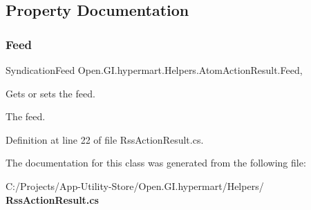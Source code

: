 \subsection{Property Documentation}
\mbox{\label{class_open_1_1_g_i_1_1hypermart_1_1_helpers_1_1_atom_action_result_a17a5a951bdf5ed9f8a93f24843e124ca}} 
\subsubsection{Feed}
{\footnotesize\ttfamily Syndication\+Feed Open.\+G\+I.\+hypermart.\+Helpers.\+Atom\+Action\+Result.\+Feed\hspace{0.3cm}{\ttfamily [get]}, {\ttfamily [set]}}



Gets or sets the feed. 

The feed. 

Definition at line 22 of file Rss\+Action\+Result.\+cs.



The documentation for this class was generated from the following file\+:\begin{DoxyCompactItemize}
\item 
C\+:/\+Projects/\+App-\/\+Utility-\/\+Store/\+Open.\+G\+I.\+hypermart/\+Helpers/\textbf{ Rss\+Action\+Result.\+cs}\end{DoxyCompactItemize}
